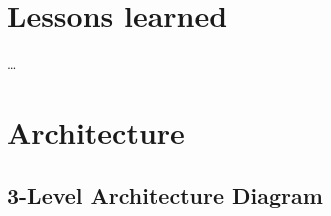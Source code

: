 \documentclass[10pt,conference,final,letterpaper,twoside,twocolumn,]{IEEEtran}
\begin{document}
\section{Lessons learned}
\label{sec:lessons}

\ldots

\section{Architecture}
\label{sec:arch}

\subsection{3-Level Architecture Diagram}






\end{document}
